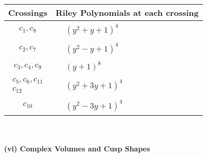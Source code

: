 \documentclass[1p]{elsarticle_modified}
\theoremstyle{definition}
\begin{document}
\begin{tabular}{m{50pt}|m{274pt}}
Crossings & \hspace{64pt}Riley Polynomials at each crossing \\
\hline $$\begin{aligned}c_{1},c_{8}\end{aligned}$$&$\begin{aligned}
&(y^2+y+1)^4
\end{aligned}$\\
\hline $$\begin{aligned}c_{2},c_{7}\end{aligned}$$&$\begin{aligned}
&(y^2- y+1)^4
\end{aligned}$\\
\hline $$\begin{aligned}c_{3},c_{4},c_{9}\end{aligned}$$&$\begin{aligned}
&(y+1)^8
\end{aligned}$\\
\hline $$\begin{aligned}c_{5},c_{6},c_{11}\\c_{12}\end{aligned}$$&$\begin{aligned}
&(y^2+3 y+1)^4
\end{aligned}$\\
\hline $$\begin{aligned}c_{10}\end{aligned}$$&$\begin{aligned}
&(y^2-3 y+1)^4
\end{aligned}$\\
\hline
\end{tabular}\\~\\
\newpage\flushleft \textbf{(vi) Complex Volumes and Cusp Shapes}
\end{document}
